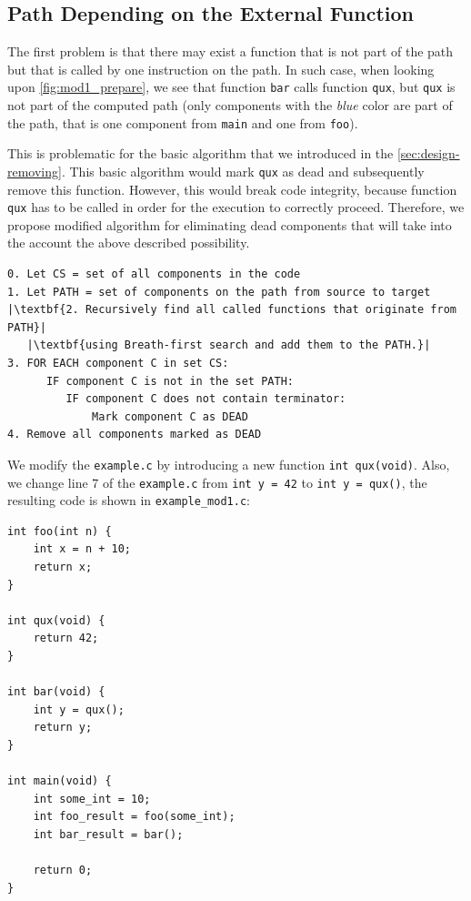 \documentclass[12pt, twoside]{fithesis2}
\renewcommand{\_}{\leavevmode \kern0.07em\vbox{\hrule width0.4em}}
\begin{document}
\clearpage

\subsection{Path Depending on the External Function}
\label{subsec:path_function}

The first problem is that there may exist a function that is not part of the
path but that is called by one instruction on the path.
In such case, when looking upon \autoref{fig:mod1_prepare}, we see that
function \texttt{bar} calls function \texttt{qux}, but
\texttt{qux} is not part of the computed path (only components with
the \emph{blue} color are part of the path, that is one component from
\texttt{main} and one from \texttt{foo}).

This is problematic for the basic algorithm that we introduced in the
\autoref{sec:design-removing}.
This basic algorithm would mark \texttt{qux} as dead and subsequently
remove this function.
However, this would break code integrity, because function
\texttt{qux} has to be called in order for the execution to correctly
proceed.
Therefore, we propose modified algorithm for eliminating dead components that
will take into the account the above described possibility.

\begin{verbatim}
0. Let CS = set of all components in the code
1. Let PATH = set of components on the path from source to target
|\textbf{2. Recursively find all called functions that originate from PATH}|
   |\textbf{using Breath-first search and add them to the PATH.}|
3. FOR EACH component C in set CS:
      IF component C is not in the set PATH:
         IF component C does not contain terminator:
             Mark component C as DEAD
4. Remove all components marked as DEAD
\end{verbatim}


We modify the \texttt{example.c} by introducing a new function
\texttt{int qux(void)}. Also, we change line 7 of the
\texttt{example.c} from
\texttt{int y = 42} to \texttt{int y = qux()}, the resulting code
is shown in \texttt{example_mod1.c}:

\begin{verbatim}
int foo(int n) {
    int x = n + 10;
    return x;
}

int qux(void) {
    return 42;
}

int bar(void) {
    int y = qux();
    return y;
}

int main(void) {
    int some_int = 10;
    int foo_result = foo(some_int);
    int bar_result = bar();

    return 0;
}
\end{verbatim}
\end{document}
